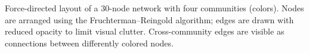 \caption{Force-directed layout of a 30-node network with four communities (colors). Nodes are arranged using the Fruchterman--Reingold algorithm; edges are drawn with reduced opacity to limit visual clutter. Cross-community edges are visible as connections between differently colored nodes.}
